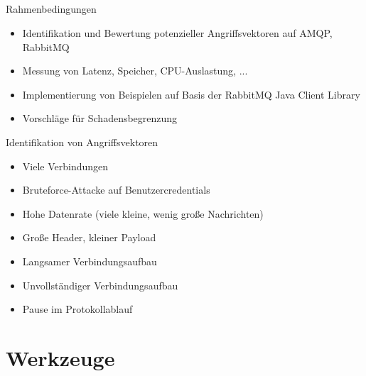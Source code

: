 \documentclass[10pt]{beamer}
\begin{document}
\subsection{}
\begin{frame}{Rahmenbedingungen}
	\begin{itemize}
		\item Identifikation und Bewertung potenzieller Angriffsvektoren auf AMQP, RabbitMQ
		\item Messung von Latenz, Speicher, CPU-Auslastung, ...
		\item Implementierung von Beispielen auf Basis der RabbitMQ Java Client Library
		\item Vorschläge für Schadensbegrenzung
	\end{itemize}
\end{frame}


\begin{frame}{Identifikation von Angriffsvektoren}
	\begin{itemize}
		\item Viele Verbindungen
		\item Bruteforce-Attacke auf Benutzercredentials
		\item Hohe Datenrate (viele kleine, wenig große Nachrichten)
		\item Große Header, kleiner Payload
		\item Langsamer Verbindungsaufbau
		\item Unvollständiger Verbindungsaufbau
		\item Pause im Protokollablauf
	\end{itemize}
\end{frame}



\section{Werkzeuge}
\end{document}
